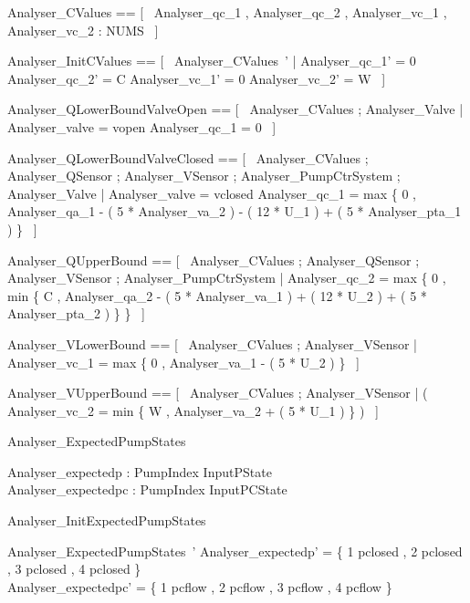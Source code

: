 \documentclass{article}
\begin{document}
\begin{zed}
	Analyser\_CValues == [~  Analyser\_qc\_1 , Analyser\_qc\_2 , Analyser\_vc\_1 , Analyser\_vc\_2 : NUMS  ~]
\end{zed}

\begin{zed}
	Analyser\_InitCValues == [~  Analyser\_CValues~' | Analyser\_qc\_1' = 0 \land Analyser\_qc\_2' = C \land Analyser\_vc\_1' = 0 \land Analyser\_vc\_2' = W  ~]
\end{zed}

\begin{zed}
	Analyser\_QLowerBoundValveOpen == [~  Analyser\_CValues ; Analyser\_Valve | Analyser\_valve = vopen \land Analyser\_qc\_1 = 0  ~]
\end{zed}

\begin{zed}
	Analyser\_QLowerBoundValveClosed == [~  Analyser\_CValues ; Analyser\_QSensor ; Analyser\_VSensor ; Analyser\_PumpCtrSystem ; Analyser\_Valve | Analyser\_valve = vclosed \land Analyser\_qc\_1 = max \{ 0 , Analyser\_qa\_1 - ( 5 * Analyser\_va\_2 ) - ( 12 * U\_1 ) + ( 5 * Analyser\_pta\_1 ) \}  ~]
\end{zed}

\begin{zed}
	Analyser\_QUpperBound == [~  Analyser\_CValues ; Analyser\_QSensor ; Analyser\_VSensor ; Analyser\_PumpCtrSystem | Analyser\_qc\_2 = max \{ 0 , min \{ C , Analyser\_qa\_2 - ( 5 * Analyser\_va\_1 ) + ( 12 * U\_2 ) + ( 5 * Analyser\_pta\_2 ) \} \}  ~]
\end{zed}

\begin{zed}
	Analyser\_VLowerBound == [~  Analyser\_CValues ; Analyser\_VSensor | Analyser\_vc\_1 = max \{ 0 , Analyser\_va\_1 - ( 5 * U\_2 ) \}  ~]
\end{zed}

\begin{zed}
	Analyser\_VUpperBound == [~  Analyser\_CValues ; Analyser\_VSensor | ( Analyser\_vc\_2 = min \{ W , Analyser\_va\_2 + ( 5 * U\_1 ) \} )  ~]
\end{zed}

\begin{schema}{Analyser\_ExpectedPumpStates}

 Analyser\_expectedp : PumpIndex \fun InputPState \\
 Analyser\_expectedpc : PumpIndex \fun InputPCState
\end{schema}

\begin{schema}{Analyser\_InitExpectedPumpStates}

 Analyser\_ExpectedPumpStates~' 
\where
 Analyser\_expectedp' = \{ 1 \mapsto pclosed , 2 \mapsto pclosed , 3 \mapsto pclosed , 4 \mapsto pclosed \} \\
 Analyser\_expectedpc' = \{ 1 \mapsto pcflow , 2 \mapsto pcflow , 3 \mapsto pcflow , 4 \mapsto pcflow \}
\end{schema}
\end{document}
